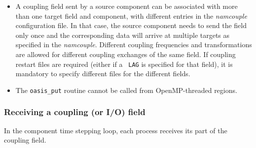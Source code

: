 \begin{itemize}
\item A coupling field sent by a source component can be
  associated with more than one target field and component, with different entries in the {\it namcouple} configuration
  file. In that case, the source component needs to send the field only
  once and the corresponding data will arrive at multiple targets as
  specified in the {\it namcouple}. Different coupling frequencies and
  transformations are allowed for different coupling exchanges of the
  same field. If coupling restart files are required (either if a {\tt
    LAG} is specified for that field), it is
  mandatory to specify different files for the different fields.

\item The {\tt oasis\_put} routine cannot be called from OpenMP-threaded regions.
  


\end{itemize}

\subsubsection{Receiving a coupling (or I/O) field}

In the component time stepping loop, each process receives its part of the
coupling field.

